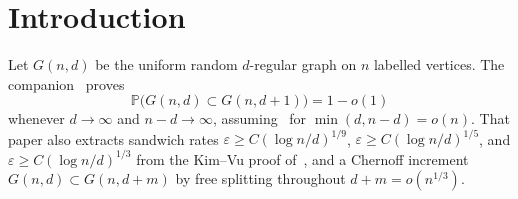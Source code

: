 \documentclass[11pt]{article}
\newcommand{\Gnd}{G(n,d)}
\newcommand{\PP}{\mathbb{P}}
\begin{document}
\tableofcontents

\section{Introduction}

Let \(\Gnd\) be the uniform random \(d\)-regular graph on \(n\) labelled vertices.
The companion~\cite{PlusOneV1} proves
\[
\PP\bigl(G(n,d)\subset G(n,d+1)\bigr)=1-o(1)
\]
whenever \(d\to\infty\) and \(n-d\to\infty\), assuming~\cite[Theorem~6]{Gao20}
for \(\min(d,n-d)=o(n)\).
That paper also extracts sandwich rates
\(\varepsilon\ge C(\log n/d)^{1/9}\),
\(\varepsilon\ge C(\log n/d)^{1/5}\), and
\(\varepsilon\ge C(\log n/d)^{1/3}\)
from the Kim--Vu proof of~\cite{BIM25}, and a Chernoff increment
\(G(n,d)\subset G(n,d+m)\) by free splitting throughout \(d+m=o(n^{1/3})\).
\end{document}
